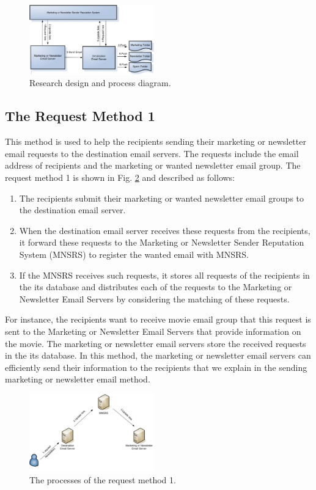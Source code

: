 \documentclass[conference]{IEEEtran}
\begin{document}
\begin{figure}
\centering
\includegraphics[width=0.48\textwidth]{1_FMNSRS.pdf}
\caption{Research design and process diagram.}
\label{fig:FMNRS}
\end{figure}

\subsection{The Request Method 1}
This method is used to help the recipients sending their marketing or newsletter email requests to the destination email servers.
%
The requests include the email address of recipients and the marketing or wanted newsletter email group.
%
The request method 1 is
shown in Fig. \ref{fig:Method1} and described as follows:
%
\begin{enumerate}
  \item The recipients submit their marketing or wanted newsletter email groups to the destination email server. 
  \item When the destination email server receives these requests from the recipients, it forward these requests to the Marketing or Newsletter Sender Reputation System (MNSRS) to register the wanted email with MNSRS. 
  \item If the MNSRS receives such requests, it stores all requests of the recipients in the its database and distributes each of the requests to the Marketing or Newsletter Email Servers by considering the matching of these requests.
\end{enumerate}

For instance, the recipients want to receive movie email group that this request is sent to the Marketing or Newsletter Email Servers that provide information on the movie.
%
The marketing or newsletter email servers store the received requests in the its database.
%
In this method, the marketing or newsletter email servers can efficiently send their information to the recipients that we explain in the sending marketing or newsletter email method.

\begin{figure}
\centering
\includegraphics[width=0.48\textwidth]{2.pdf}
\caption{The processes of the request method 1.}
\label{fig:Method1}
\end{figure}
\end{document}

